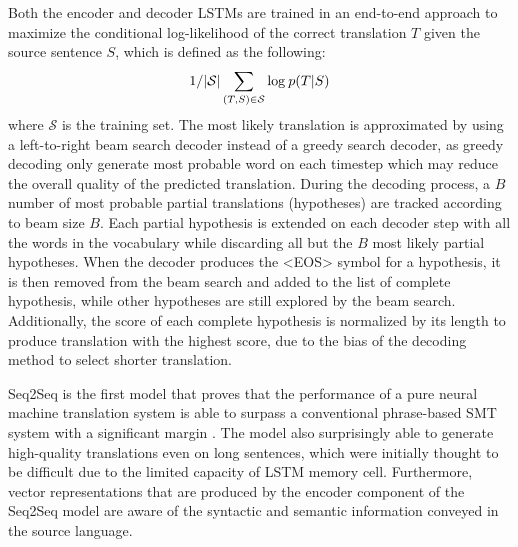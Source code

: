 \documentclass[12pt]{extarticle}
\begin{document}
Both the encoder and decoder LSTMs are trained in an end-to-end approach to maximize the conditional log-likelihood of the correct translation $T$ given the source sentence $S$, which is defined as the following:
\begin{align}
1/ |\mathcal{S}| \sum_{(T,S) \in \mathcal{S}} \textnormal{log}\: p(T|S)
\end{align}
where $\mathcal{S}$ is the training set. The most likely translation is approximated by using a left-to-right beam search decoder instead of a greedy search decoder, as greedy decoding only generate most probable word on each timestep which may reduce the overall quality of the predicted translation. During the decoding process, a $B$ number of most probable partial translations (hypotheses) are tracked according to beam size $B$. Each partial hypothesis is extended on each decoder step with all the words in the vocabulary while discarding all but the $B$ most likely partial hypotheses. When the decoder produces the \textless EOS\textgreater{} symbol for a hypothesis, it is then removed from the beam search and added to the list of complete hypothesis, while other hypotheses are still explored by the beam search. Additionally, the score of each complete hypothesis is normalized by its length to produce translation with the highest score, due to the bias of the decoding method to select shorter translation.

Seq2Seq is the first model that proves that the performance of a pure neural machine translation system is able to surpass a conventional phrase-based SMT system with a significant margin \citep{Sutskever:2014:SSL:2969033.2969173}. The model also surprisingly able to generate high-quality translations even on long sentences, which were initially thought to be difficult due to the limited capacity of LSTM memory cell. Furthermore, vector representations that are produced by the encoder component of the Seq2Seq model are aware of the syntactic and semantic information conveyed in the source language.  
\end{document}
